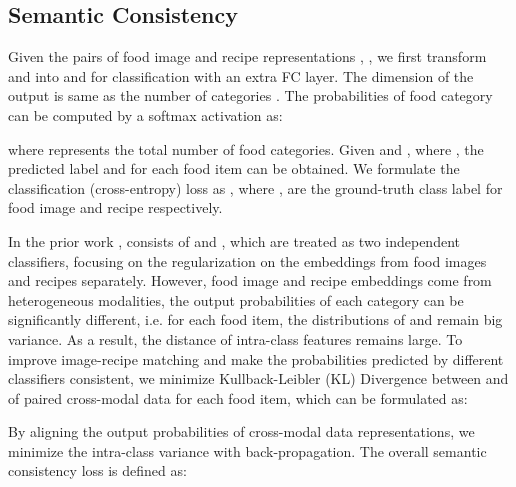 \documentclass[journal]{IEEEtran}
\begin{document}
\subsection{Semantic Consistency}

Given the pairs of food image and recipe representations , , we first transform  and  into  and  for classification with an extra FC layer. The dimension of the output is same as the number of categories . The probabilities of food category  can be computed by a softmax activation as:
 



where  represents the total number of food categories. Given  and , where , the predicted label  and  for each food item can be obtained. We formulate the classification (cross-entropy) loss as , where ,  are the ground-truth class label for food image and recipe respectively.

In the prior work \cite{salvador2017learning},  consists of  and , which are treated as two independent classifiers, focusing on the regularization on the embeddings from food images and recipes separately. However, food image and recipe embeddings come from heterogeneous modalities, the output probabilities of each category can be significantly different, i.e. for each food item, the distributions of  and  remain big variance. As a result, the distance of intra-class features remains large. To improve image-recipe matching and make the probabilities predicted by different classifiers consistent, we minimize Kullback-Leibler (KL) Divergence between  and  of paired cross-modal data for each food item, which can be formulated as:





By aligning the output probabilities of cross-modal data representations, we minimize the intra-class variance with back-propagation. The overall semantic consistency loss  is defined as:
\end{document}
